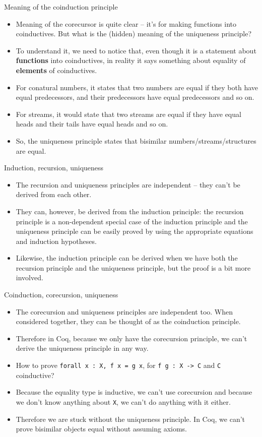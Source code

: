 \documentclass{beamer}
\begin{document}
\begin{frame}{Meaning of the coinduction principle}
\begin{itemize}
	\item Meaning of the corecursor is quite clear -- it's for making functions into coinductives. But what is the (hidden) meaning of the uniqueness principle?
	\item To understand it, we need to notice that, even though it is a statement about \textbf{functions} into coinductives, in reality it says something about equality of \textbf{elements} of coinductives.
	\item For conatural numbers, it states that two numbers are equal if they both have equal predecessors, and their predecessors have equal predecessors and so on.
	\item For streams, it would state that two streams are equal if they have equal heads and their tails have equal heads and so on.
	\item So, the uniqueness principle states that bisimilar numbers/streams/structures are equal.
\end{itemize}
\end{frame}

\begin{frame}{Induction, recursion, uniqueness}
\begin{itemize}
	\item The recursion and uniqueness principles are independent -- they can't be derived from each other.
	\item They can, however, be derived from the induction principle: the recursion principle is a non-dependent special case of the induction principle and the uniqueness principle can be easily proved by using the appropriate equations and induction hypotheses.
	\item Likewise, the induction principle can be derived when we have both the recursion principle and the uniqueness principle, but the proof is a bit more involved.
\end{itemize}
\end{frame}

\begin{frame}{Coinduction, corecursion, uniqueness}
\begin{itemize}
	\item The corecursion and uniqueness principles are independent too. When considered together, they can be thought of as the coinduction principle.
	\item Therefore in Coq, because we only have the corecursion principle, we can't derive the uniqueness principle in any way.
	\item How to prove \texttt{forall x :\ X, f x = g x}, for \texttt{f g :\ X -> C} and \texttt{C} coinductive?
	\item Because the equality type is inductive, we can't use corecursion and because we don't know anything about \texttt{X}, we can't do anything with it either.
	\item Therefore we are stuck without the uniqueness principle. In Coq, we can't prove bisimilar objects equal without assuming axioms.
\end{itemize}
\end{frame}
\end{document}
